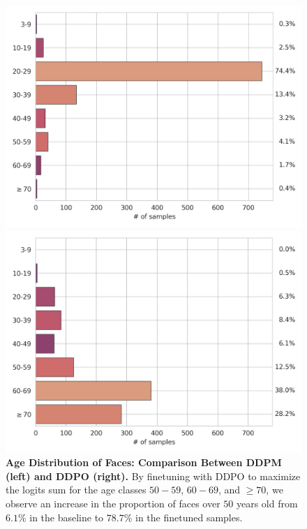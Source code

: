 \begin{figure}[ht]
  \centering
  \begin{minipage}{0.5\textwidth}
    \centering
    \includegraphics[width=1\textwidth]{img/results/age-dist-ddpm-celebahqsample-based-on-vit-age-preds-on-faces.png} %
  \end{minipage}\hfill
  \begin{minipage}{0.5\textwidth}
    \centering
    \includegraphics[width=1\textwidth]{img/results/age-dist-ddpo-celebahqsample-based-on-vit-age-preds-on-faces.png} %
  \end{minipage}
  \vspace{-8pt}  %
  \captionsetup{width=\textwidth} %
  \caption{\textbf{Age Distribution of Faces: Comparison Between DDPM (left) and DDPO (right).} By finetuning with DDPO to maximize the logits sum for the age classes 
  \texttt{$50-59$}, \texttt{$60-69$}, and \texttt{$\geq 70$}, we observe an increase in the proportion of faces over $50$ years old from $6.1\%$ in the baseline to $78.7\%$ in the finetuned samples.}
  \label{fig:age-face-dist} 
\end{figure}


